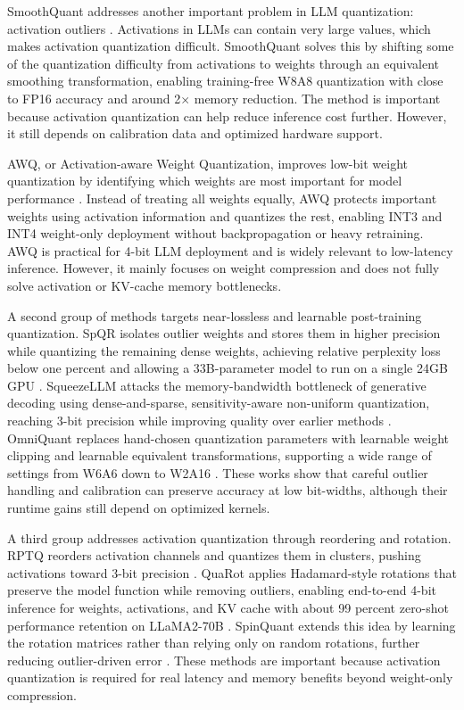 SmoothQuant addresses another important problem in LLM quantization: activation outliers \cite{xiao2023smoothquant}. Activations in LLMs can contain very large values, which makes activation quantization difficult. SmoothQuant solves this by shifting some of the quantization difficulty from activations to weights through an equivalent smoothing transformation, enabling training-free W8A8 quantization with close to FP16 accuracy and around 2$\times$ memory reduction. The method is important because activation quantization can help reduce inference cost further. However, it still depends on calibration data and optimized hardware support.

AWQ, or Activation-aware Weight Quantization, improves low-bit weight quantization by identifying which weights are most important for model performance \cite{lin2024awq}. Instead of treating all weights equally, AWQ protects important weights using activation information and quantizes the rest, enabling INT3 and INT4 weight-only deployment without backpropagation or heavy retraining. AWQ is practical for 4-bit LLM deployment and is widely relevant to low-latency inference. However, it mainly focuses on weight compression and does not fully solve activation or KV-cache memory bottlenecks.

A second group of methods targets near-lossless and learnable post-training quantization. SpQR isolates outlier weights and stores them in higher precision while quantizing the remaining dense weights, achieving relative perplexity loss below one percent and allowing a 33B-parameter model to run on a single 24GB GPU \cite{dettmers2024spqr}. SqueezeLLM attacks the memory-bandwidth bottleneck of generative decoding using dense-and-sparse, sensitivity-aware non-uniform quantization, reaching 3-bit precision while improving quality over earlier methods \cite{kim2024squeezellm}. OmniQuant replaces hand-chosen quantization parameters with learnable weight clipping and learnable equivalent transformations, supporting a wide range of settings from W6A6 down to W2A16 \cite{shao2024omniquant}. These works show that careful outlier handling and calibration can preserve accuracy at low bit-widths, although their runtime gains still depend on optimized kernels.

A third group addresses activation quantization through reordering and rotation. RPTQ reorders activation channels and quantizes them in clusters, pushing activations toward 3-bit precision \cite{yuan2023rptq}. QuaRot applies Hadamard-style rotations that preserve the model function while removing outliers, enabling end-to-end 4-bit inference for weights, activations, and KV cache with about 99 percent zero-shot performance retention on LLaMA2-70B \cite{ashkboos2024quarot}. SpinQuant extends this idea by learning the rotation matrices rather than relying only on random rotations, further reducing outlier-driven error \cite{liu2025spinquant}. These methods are important because activation quantization is required for real latency and memory benefits beyond weight-only compression.


